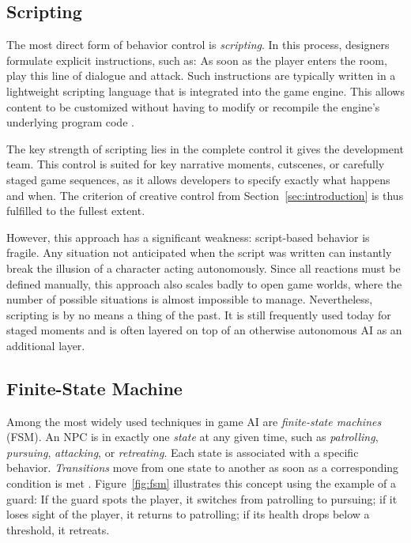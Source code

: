 \subsection{Scripting}

The most direct form of behavior control is \emph{scripting}. In this process, designers formulate explicit instructions, such as: \glqq As soon as the player enters the room, play this line of dialogue and attack.\grqq{} Such instructions are typically written in a lightweight scripting language that is integrated into the game engine. This allows content to be customized without having to modify or recompile the engine’s underlying program code \cite{millington2009}.

The key strength of scripting lies in the complete control it gives the development team. This control is suited for key narrative moments, cutscenes, or carefully staged game sequences, as it allows developers to specify exactly what happens and when. The criterion of creative control from Section~\ref{sec:introduction} is thus fulfilled to the fullest extent.

However, this approach has a significant weakness: script-based behavior is fragile. Any situation not anticipated when the script was written can instantly break the illusion of a character acting autonomously. Since all reactions must be defined manually, this approach also scales badly to open game worlds, where the number of possible situations is almost impossible to manage. Nevertheless, scripting is by no means a thing of the past. It is still frequently used today for staged moments and is often layered on top of an otherwise autonomous AI as an additional layer. %

\subsection{Finite-State Machine}

Among the most widely used techniques in game AI are \emph{finite-state machines} (FSM). An NPC is in exactly one \emph{state} at any given time, such as \emph{patrolling}, \emph{pursuing}, \emph{attacking}, or \emph{retreating}. Each state is associated with a specific behavior. \emph{Transitions} move from one state to another as soon as a corresponding condition is met \cite{buckland2005,millington2009}. Figure~\ref{fig:fsm} illustrates this concept using the example of a guard: If the guard spots the player, it switches from patrolling to pursuing; if it loses sight of the player, it returns to patrolling; if its health drops below a threshold, it retreats.

